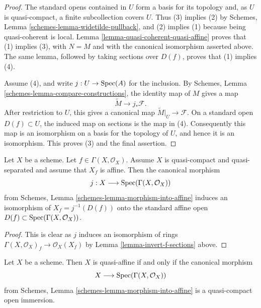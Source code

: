 \begin{proof}
The standard opens contained in $U$ form a basis for its topology and,
as $U$ is quasi-compact, a finite subcollection covers $U$.
Thus (3) implies (2) by
Schemes, Lemma \ref{schemes-lemma-widetilde-pullback}, and (2) implies
(1) because being quasi-coherent is local. Lemma
\ref{lemma-quasi-coherent-quasi-affine} proves that (1) implies (3),
with $N = M$ and with the canonical isomorphism asserted above. The same
lemma, followed by taking sections over $D(f)$, proves that (1) implies
(4).

Assume (4), and write $j : U \to \mathop{\mathrm{Spec}}(A)$ for the inclusion. By
Schemes, Lemma \ref{schemes-lemma-compare-constructions}, the identity
map of $M$ gives a map
$$
\widetilde M \longrightarrow j_*\mathcal{F}.
$$
After restriction to $U$, this gives a canonical map
$\widetilde M|_U \to \mathcal{F}$. On a standard open
$D(f) \subset U$, the induced map on sections is the map in (4).
Consequently this map is an isomorphism on a basis for the topology of
$U$, and hence it is an isomorphism. This proves (3) and the final
assertion.
\end{proof}

\begin{lemma}
\label{lemma-invert-f-affine}
Let $X$ be a scheme. Let $f \in \Gamma(X, \mathcal{O}_X)$.
Assume $X$ is quasi-compact and quasi-separated and assume that
$X_f$ is affine. Then the canonical morphism
$$
j : X \longrightarrow \mathop{\mathrm{Spec}}(\Gamma(X, \mathcal{O}_X))
$$
from Schemes, Lemma \ref{schemes-lemma-morphism-into-affine}
induces an isomorphism of $X_f = j^{-1}(D(f))$ onto the standard affine
open $D(f) \subset \mathop{\mathrm{Spec}}(\Gamma(X, \mathcal{O}_X))$.
\end{lemma}

\begin{proof}
This is clear as $j$ induces an isomorphism of rings
$\Gamma(X, \mathcal{O}_X)_f \to \mathcal{O}_X(X_f)$ by
Lemma \ref{lemma-invert-f-sections} above.
\end{proof}

\begin{lemma}
\label{lemma-quasi-affine}
Let $X$ be a scheme. Then $X$ is quasi-affine if and only if
the canonical morphism
$$
X \longrightarrow \mathop{\mathrm{Spec}}(\Gamma(X, \mathcal{O}_X))
$$
from Schemes, Lemma \ref{schemes-lemma-morphism-into-affine} is
a quasi-compact open immersion.
\end{lemma}

